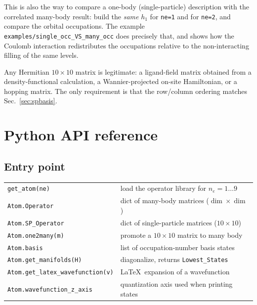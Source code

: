 \documentclass[11pt,a4paper]{article}
\newcommand{\op}[1]{\texttt{#1}}
\begin{document}
\noindent
This is also the way to compare a one-body (single-particle) description with
the correlated many-body result: build the \emph{same} $h_1$ for \op{ne=1} and
for \op{ne=2}, and compare the orbital occupations.  The example
\op{examples/single\_occ\_VS\_many\_occ} does precisely that, and shows how the
Coulomb interaction redistributes the occupations relative to the
non-interacting filling of the same levels.

Any Hermitian $10\times 10$ matrix is legitimate: a ligand-field matrix obtained
from a density-functional calculation, a Wannier-projected on-site Hamiltonian,
or a hopping matrix.  The only requirement is that the row/column ordering
matches Sec.~\ref{sec:spbasis}.

\section{Python API reference}

\subsection{Entry point}

\begin{center}
\begin{tabular}{ll}
\toprule
\op{get\_atom(ne)}             & load the operator library for $n_e=1\ldots9$\\
\op{Atom.Operator}             & dict of many-body matrices ($\dim\times\dim$)\\
\op{Atom.SP\_Operator}         & dict of single-particle matrices ($10\times10$)\\
\op{Atom.one2many(m)}          & promote a $10\times10$ matrix to many body\\
\op{Atom.basis}                & list of occupation-number basis states\\
\op{Atom.get\_manifolds(H)}    & diagonalize, returns \op{Lowest\_States}\\
\op{Atom.get\_latex\_wavefunction(v)} & \LaTeX\ expansion of a wavefunction\\
\op{Atom.wavefunction\_z\_axis}& quantization axis used when printing states\\
\bottomrule
\end{tabular}
\end{center}
\end{document}
